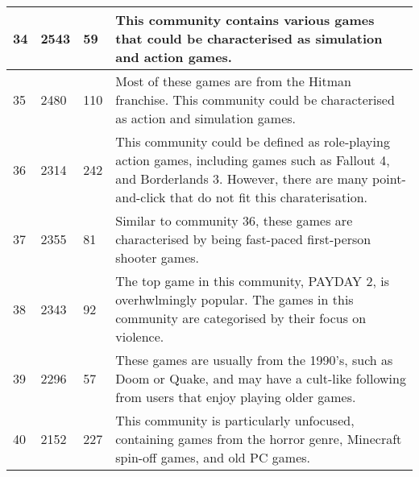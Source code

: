 \begin{table}
\begin{tabular}{
        |p{}
        |p{}
        |p{}
        |p{}|}
        34 & 2543 & 59 & This community contains various games that could be characterised as simulation and action games.\\ \hline
        35 & 2480 & 110 & Most of these games are from the Hitman franchise. This community could be characterised as action and simulation games.\\ \hline
        36 & 2314 & 242 & This community could be defined as role-playing action games, including games such as Fallout 4, and Borderlands 3. However, there are many point-and-click that do not fit this charaterisation. \\ \hline
        37 & 2355 & 81 & Similar to community 36, these games are characterised by being fast-paced first-person shooter games. \\ \hline
        38 & 2343 & 92 & The top game in this community, PAYDAY 2, is overhwlmingly popular. The games in this community are categorised by their focus on violence. \\ \hline
        39 & 2296 & 57 & These games are usually from the 1990's, such as Doom or Quake, and may have a cult-like following from users that enjoy playing older games.\\ \hline
        40 & 2152 & 227 & This community is particularly unfocused, containing games from the horror genre, Minecraft spin-off games, and old PC games.\\ \hline
    \end{tabular}
    \label{tab:appendix}
\end{table}